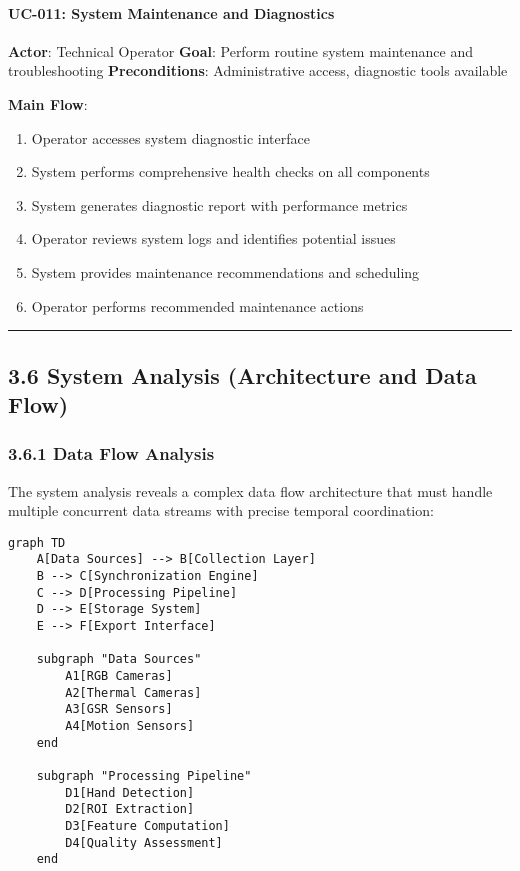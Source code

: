 \documentclass[12pt,a4paper]{article}
\begin{document}
\paragraph{UC-011: System Maintenance and Diagnostics}

\textbf{Actor}: Technical Operator  
\textbf{Goal}: Perform routine system maintenance and troubleshooting  
\textbf{Preconditions}: Administrative access, diagnostic tools available

\textbf{Main Flow}:

\begin{enumerate}
\item Operator accesses system diagnostic interface
\item System performs comprehensive health checks on all components
\item System generates diagnostic report with performance metrics
\item Operator reviews system logs and identifies potential issues
\item System provides maintenance recommendations and scheduling
\item Operator performs recommended maintenance actions

\end{enumerate}
\hrule

\subsection{3.6 System Analysis (Architecture and Data Flow)}

\subsubsection{3.6.1 Data Flow Analysis}

The system analysis reveals a complex data flow architecture that must handle multiple concurrent data streams with
precise temporal coordination:

\begin{verbatim}
graph TD
    A[Data Sources] --> B[Collection Layer]
    B --> C[Synchronization Engine]
    C --> D[Processing Pipeline]
    D --> E[Storage System]
    E --> F[Export Interface]

    subgraph "Data Sources"
        A1[RGB Cameras]
        A2[Thermal Cameras]
        A3[GSR Sensors]
        A4[Motion Sensors]
    end

    subgraph "Processing Pipeline"
        D1[Hand Detection]
        D2[ROI Extraction]
        D3[Feature Computation]
        D4[Quality Assessment]
    end
\end{verbatim}
\end{document}

